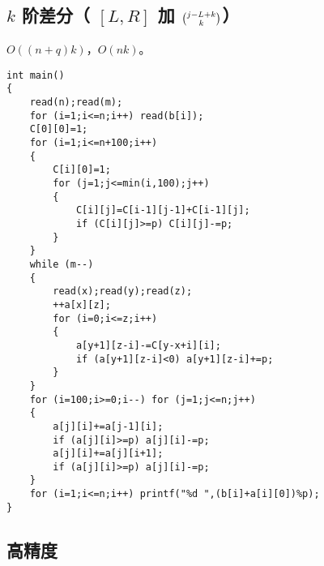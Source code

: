 \documentclass[12pt]{ctexart}
\begin{document}
\subsection{$k$ 阶差分（ $[L,R]$ 加 $\tbinom{j-L+k}{k}$）}

$O((n+q)k)$，$O(nk)$。

\begin{lstlisting}
int main()
{
	read(n);read(m);
	for (i=1;i<=n;i++) read(b[i]);
	C[0][0]=1;
	for (i=1;i<=n+100;i++)
	{
		C[i][0]=1;
		for (j=1;j<=min(i,100);j++)
		{
			C[i][j]=C[i-1][j-1]+C[i-1][j];
			if (C[i][j]>=p) C[i][j]-=p;
		}
	}
	while (m--)
	{
		read(x);read(y);read(z);
		++a[x][z];
		for (i=0;i<=z;i++)
		{
			a[y+1][z-i]-=C[y-x+i][i];
			if (a[y+1][z-i]<0) a[y+1][z-i]+=p;
		}
	}
	for (i=100;i>=0;i--) for (j=1;j<=n;j++)
	{
		a[j][i]+=a[j-1][i];
		if (a[j][i]>=p) a[j][i]-=p;
		a[j][i]+=a[j][i+1];
		if (a[j][i]>=p) a[j][i]-=p;
	}
	for (i=1;i<=n;i++) printf("%d ",(b[i]+a[i][0])%p);
}
\end{lstlisting}

\subsection{高精度}
\end{document}
